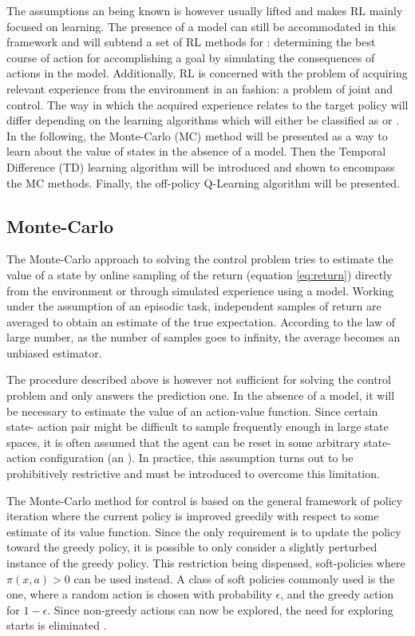 The assumptions an  being known is however usually
lifted and makes RL mainly focused on  learning. The presence
of a model can still be accommodated in this framework and will subtend a set of RL
methods for : determining the best course of action for
accomplishing a goal by simulating the consequences of actions in the model.
Additionally, RL is concerned with the problem of acquiring relevant experience
from the environment in an  fashion: a problem of joint
 and control. The way in which the acquired experience relates
to the target policy will differ depending on the learning algorithms which will either
be classified as  or . In the following, the
Monte-Carlo (MC) method will be presented as a way to learn about the value of
states in the absence of a model. Then the Temporal Difference (TD) learning
algorithm will be introduced and shown to encompass the MC methods. Finally, the
off-policy Q-Learning algorithm will be presented. 

\subsection{Monte-Carlo}
The Monte-Carlo approach to solving the control problem tries to estimate the value
of a state by online sampling of the return (equation \ref{eq:return}) directly from the
environment or through simulated experience using a model. Working under the
assumption of an episodic task, independent samples of return are averaged to
obtain an estimate of the true expectation. According to the law of large number, as
the number of samples goes to infinity, the average becomes an unbiased
estimator. 

The procedure described above is however not sufficient for solving the control
problem and only answers the prediction one. In the absence of a model, it will be
necessary to estimate the value of an action-value function. Since certain state-
action pair might be difficult to sample frequently enough in large state spaces, it
is often assumed that the agent can be reset in some arbitrary state-action
configuration (an ). In practice, this assumption turns out to
be prohibitively restrictive and  must be introduced to overcome
this limitation. 

The Monte-Carlo method for control is based on the general framework of policy
iteration where the current policy is improved greedily with respect to some
estimate of its value function. Since the only requirement is to update the policy
toward the greedy policy, it is possible to only consider a slightly perturbed instance
of the greedy policy. This restriction being dispensed, soft-policies where $\pi(x, a)
> 0$ can be used instead. A class of soft policies commonly used is the
 one, where a random action is chosen with probability
$\epsilon$, and the greedy action for $1 - \epsilon$. Since non-greedy actions can
now be explored, the need for exploring starts is eliminated \cite{SuttonBarto1998}.

